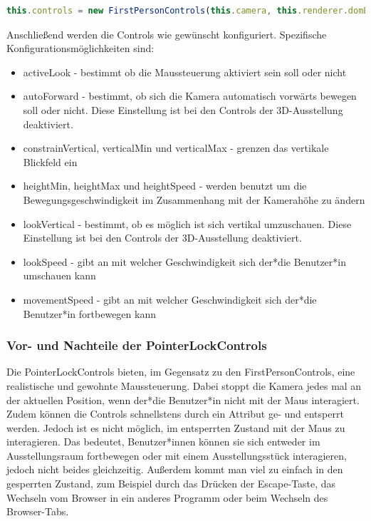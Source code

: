 \begin{lstlisting}[caption={FirstPersonControls initialisieren},language=TypeScript]
    this.controls = new FirstPersonControls(this.camera, this.renderer.domElement)
    \end{lstlisting}

Anschließend werden die Controls wie gewünscht konfiguriert. Spezifische Konfigurationsmöglichkeiten sind: 

\begin{itemize}
    \item activeLook - bestimmt ob die Maussteuerung aktiviert sein soll oder nicht
    \item autoForward - bestimmt, ob sich die Kamera automatisch vorwärts bewegen soll oder nicht. Diese Einstellung ist bei den Controls der 3D-Ausstellung deaktiviert.
    \item constrainVertical, verticalMin und verticalMax - grenzen das vertikale Blickfeld ein
    \item heightMin, heightMax und heightSpeed - werden benutzt um die Bewegungsgeschwindigkeit im Zusammenhang mit der Kamerahöhe zu ändern
    \item lookVertical - bestimmt, ob es möglich ist sich vertikal umzuschauen. Diese Einstellung ist bei den Controls der 3D-Ausstellung deaktiviert.
    \item lookSpeed - gibt an mit welcher Geschwindigkeit sich der*die Benutzer*in umschauen kann
    \item movementSpeed - gibt an mit welcher Geschwindigkeit sich der*die Benutzer*in fortbewegen kann
\end{itemize}
\cite{FirstPersonControls}

\subsubsection{Vor- und Nachteile der PointerLockControls}

Die PointerLockControls bieten, im Gegensatz zu den FirstPersonControls, eine realistische und gewohnte Maussteuerung. Dabei stoppt die Kamera jedes mal an der aktuellen Position, wenn der*die Benutzer*in nicht mit der Maus interagiert. Zudem können die Controls schnellstens durch ein Attribut ge- und entsperrt werden. Jedoch ist es nicht möglich, im entsperrten Zustand mit der Maus zu interagieren. Das bedeutet, Benutzer*innen können sie sich entweder im Ausstellungsraum fortbewegen oder mit einem Ausstellungsstück interagieren, jedoch nicht beides gleichzeitig. Außerdem kommt man viel zu einfach in den gesperrten Zustand, zum Beispiel durch das Drücken der Escape-Taste, das Wechseln vom Browser in ein anderes Programm oder beim Wechseln des Browser-Tabs.  

